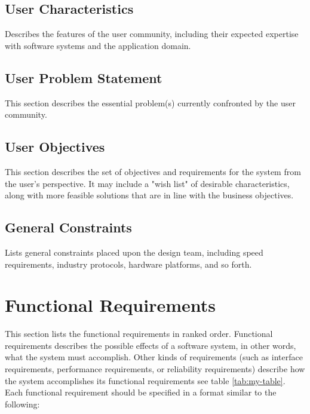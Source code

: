\documentclass[12pt]{article}
\begin{document}
\subsection{ User Characteristics}
Describes the features of the user community, including their expected expertise with software systems and the application domain. 
\subsection{ User Problem Statement}
This section describes the essential problem(s) currently confronted by the user community. 
\subsection{ User Objectives}
This section describes the set of objectives and requirements for the system from the user's perspective. It may include a "wish list" of desirable characteristics, along with more feasible solutions that are in line with the business objectives. 
\subsection{ General Constraints}
Lists general constraints placed upon the design team, including speed requirements, industry protocols, hardware platforms, and so forth. 




\section{Functional Requirements}
This section lists the functional requirements in ranked order. Functional requirements describes the possible effects of a software system, in other words, what the system must accomplish. Other kinds of requirements (such as interface requirements, performance requirements, or reliability requirements) describe how the system accomplishes its functional requirements see table \ref{tab:my-table}. Each functional requirement should be specified in a format similar to the following:  
\end{document}
